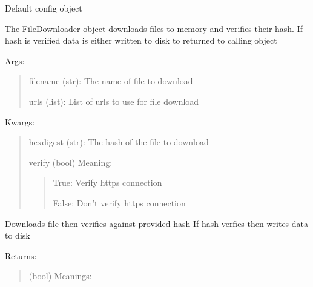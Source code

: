 \documentclass[letterpaper,10pt,english]{sphinxmanual}
\begin{document}

\begin{fulllineitems}
\label{api:pyi_updater.config.SetupConfig}
Default config object

\end{fulllineitems}

\label{api:module-pyi_updater.downloader}

\begin{fulllineitems}
\label{api:pyi_updater.downloader.FileDownloader}
The FileDownloader object downloads files to memory and
verifies their hash.  If hash is verified data is either
written to disk to returned to calling object

Args:
\begin{quote}

filename (str): The name of file to download

urls (list): List of urls to use for file download
\end{quote}

Kwargs:
\begin{quote}

hexdigest (str): The hash of the file to download

verify (bool) Meaning:
\begin{quote}

True: Verify https connection

False: Don't verify https connection
\end{quote}
\end{quote}

\begin{fulllineitems}
\label{api:pyi_updater.downloader.FileDownloader.download_verify_write}
Downloads file then verifies against provided hash
If hash verfies then writes data to disk

Returns:
\begin{quote}

(bool) Meanings:
\begin{quote}


\end{quote}
\end{quote}
\end{fulllineitems}
\end{fulllineitems}
\end{document}
